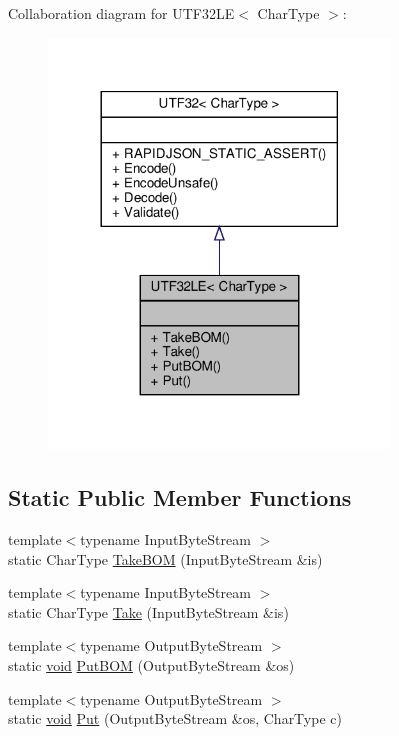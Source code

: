 Collaboration diagram for U\+T\+F32\+LE$<$ Char\+Type $>$\+:
\nopagebreak
\begin{figure}[H]
\begin{center}
\leavevmode
\includegraphics[width=257pt]{structUTF32LE__coll__graph}
\end{center}
\end{figure}
\subsection*{Static Public Member Functions}
\begin{DoxyCompactItemize}
\item 
{\footnotesize template$<$typename Input\+Byte\+Stream $>$ }\\static Char\+Type \hyperlink{structUTF32LE_a8729612b0a8b1126c61c4f8f8c34410e}{Take\+B\+OM} (Input\+Byte\+Stream \&is)
\item 
{\footnotesize template$<$typename Input\+Byte\+Stream $>$ }\\static Char\+Type \hyperlink{structUTF32LE_ad13967549811be12897362bb37b2c819}{Take} (Input\+Byte\+Stream \&is)
\item 
{\footnotesize template$<$typename Output\+Byte\+Stream $>$ }\\static \hyperlink{imgui__impl__opengl3__loader_8h_ac668e7cffd9e2e9cfee428b9b2f34fa7}{void} \hyperlink{structUTF32LE_accd97d45e55746c900dab356605825be}{Put\+B\+OM} (Output\+Byte\+Stream \&os)
\item 
{\footnotesize template$<$typename Output\+Byte\+Stream $>$ }\\static \hyperlink{imgui__impl__opengl3__loader_8h_ac668e7cffd9e2e9cfee428b9b2f34fa7}{void} \hyperlink{structUTF32LE_a61bb50e7fba27e3fe28a9f30eb366193}{Put} (Output\+Byte\+Stream \&os, Char\+Type c)
\end{DoxyCompactItemize}
